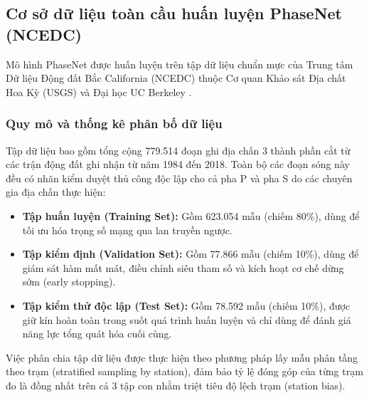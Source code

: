 \documentclass[preprint,1p]{elsarticle}
\begin{document}
\subsection{Cơ sở dữ liệu toàn cầu huấn luyện PhaseNet (NCEDC)}
\label{sec:dataset_ncedc}

Mô hình PhaseNet được huấn luyện trên tập dữ liệu chuẩn mực của Trung tâm Dữ liệu Động đất Bắc California (NCEDC) thuộc Cơ quan Khảo sát Địa chất Hoa Kỳ (USGS) và Đại học UC Berkeley \cite{ncedc2014,zhu2019phasenet}.

\subsubsection{Quy mô và thống kê phân bố dữ liệu}
Tập dữ liệu bao gồm tổng cộng 779.514 đoạn ghi địa chấn 3 thành phần cắt từ các trận động đất ghi nhận từ năm 1984 đến 2018. Toàn bộ các đoạn sóng này đều có nhãn kiểm duyệt thủ công độc lập cho cả pha P và pha S do các chuyên gia địa chấn thực hiện:
\begin{itemize}
    \item \textbf{Tập huấn luyện (Training Set):} Gồm 623.054 mẫu (chiếm 80\%), dùng để tối ưu hóa trọng số mạng qua lan truyền ngược.
    \item \textbf{Tập kiểm định (Validation Set):} Gồm 77.866 mẫu (chiếm 10\%), dùng để giám sát hàm mất mát, điều chỉnh siêu tham số và kích hoạt cơ chế dừng sớm (early stopping).
    \item \textbf{Tập kiểm thử độc lập (Test Set):} Gồm 78.592 mẫu (chiếm 10\%), được giữ kín hoàn toàn trong suốt quá trình huấn luyện và chỉ dùng để đánh giá năng lực tổng quát hóa cuối cùng.
\end{itemize}
Việc phân chia tập dữ liệu được thực hiện theo phương pháp lấy mẫu phân tầng theo trạm (stratified sampling by station), đảm bảo tỷ lệ đóng góp của từng trạm đo là đồng nhất trên cả 3 tập con nhằm triệt tiêu độ lệch trạm (station bias).
\end{document}
